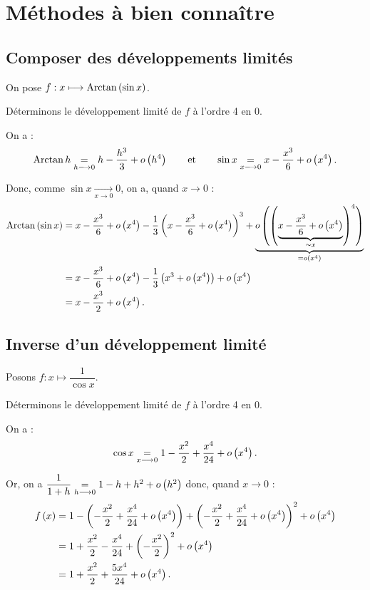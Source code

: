 \section{Méthodes à bien connaître}

\subsection{Composer des développements limités}

\begin{ex}
On pose \(f:x\longmapsto\operatorname{Arctan}\left(\sin x\right)\).

Déterminons le développement limité de \(f\) à l'ordre 4 en \(0\).

On a : \[\operatorname{Arctan} h\underset{h\longrightarrow0}{=}h-\dfrac{h^3}{3}+o\left(h^4\right)\qquad\text{et}\qquad\sin x\underset{x\longrightarrow0}{=}x-\dfrac{x^3}{6}+o\left(x^4\right).\]

Donc, comme \(\sin x\xrightarrow[x\to0]{}0\), on a, quand \(x\to0\) : \[\begin{aligned}
\operatorname{Arctan}\left(\sin x\right)&=x-\dfrac{x^3}{6}+o\left(x^4\right)-\dfrac{1}{3}\left(x-\dfrac{x^3}{6}+o\left(x^4\right)\right)^3+\underbrace{o\left(\left(\underbrace{x-\dfrac{x^3}{6}+o\left(x^4\right)}_{\sim x}\right)^4\right)}_{=o\left(x^4\right)} \\
&=x-\dfrac{x^3}{6}+o\left(x^4\right)-\dfrac{1}{3}\left(x^3+o\left(x^4\right)\right)+o\left(x^4\right) \\
&=x-\dfrac{x^3}{2}+o\left(x^4\right).
\end{aligned}\]
\end{ex}

\subsection{Inverse d'un développement limité}

\begin{ex}
Posons \(f:x\mapsto\dfrac{1}{\cos x}\).

Déterminons le développement limité de \(f\) à l'ordre 4 en \(0\).

On a : \[\cos x\underset{x\longrightarrow0}{=}1-\dfrac{x^2}{2}+\dfrac{x^4}{24}+o\left(x^4\right).\]

Or, on a \(\dfrac{1}{1+h}\underset{h\longrightarrow0}{=}1-h+h^2+o\left(h^2\right)\) donc, quand \(x\to0\) : \[\begin{aligned}
f\left(x\right)&=1-\left(-\dfrac{x^2}{2}+\dfrac{x^4}{24}+o\left(x^4\right)\right)+\left(-\dfrac{x^2}{2}+\dfrac{x^4}{24}+o\left(x^4\right)\right)^2+o\left(x^4\right) \\
&=1+\dfrac{x^2}{2}-\dfrac{x^4}{24}+\left(-\dfrac{x^2}{2}\right)^2+o\left(x^4\right) \\
&=1+\dfrac{x^2}{2}+\dfrac{5x^4}{24}+o\left(x^4\right).
\end{aligned}\]
\end{ex}

